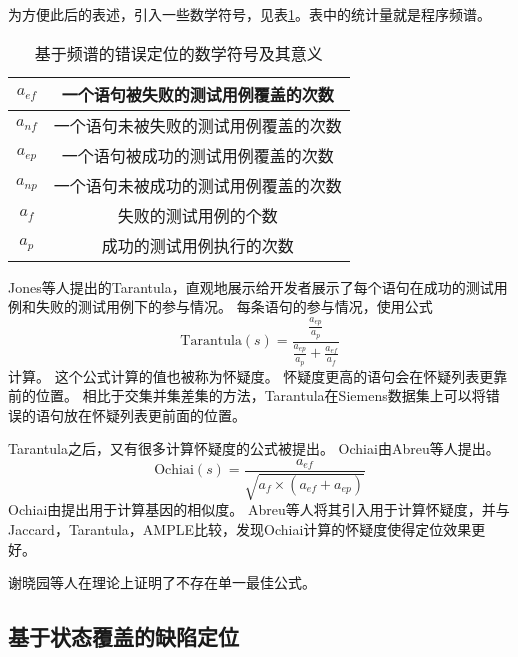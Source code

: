 为方便此后的表述，引入一些数学符号，见表\ref{spec_symbol}。表中的统计量就是程序频谱。
\begin{table}
\centering
\begin{tabular}{|c|c|}
\hline
$a_{ef}$ & 一个语句被失败的测试用例覆盖的次数 \\
\hline
$a_{nf}$ & 一个语句未被失败的测试用例覆盖的次数 \\
\hline
$a_{ep}$ & 一个语句被成功的测试用例覆盖的次数 \\
\hline
$a_{np}$ & 一个语句未被成功的测试用例覆盖的次数 \\
\hline
$a_{f}$ & 失败的测试用例的个数 \\
\hline
$a_{p}$ & 成功的测试用例执行的次数 \\
\hline
\end{tabular}
\caption{基于频谱的错误定位的数学符号及其意义}
\label{spec_symbol}
\end{table}

Jones等人提出的Tarantula\parencite{Jones2002Visualization}，直观地展示给开发者展示了每个语句在成功的测试用例和失败的测试用例下的参与情况。
每条语句的参与情况，使用公式
$$
\mathrm{Tarantula}(s) = \frac{\frac{a_{ep}}{a_{p}}}{\frac{a_{ep}}{a_{p}} + \frac{a_{ef}}{a_{f}}}
$$
计算。
这个公式计算的值也被称为怀疑度。
怀疑度更高的语句会在怀疑列表更靠前的位置。
相比于交集并集差集的方法，Tarantula在Siemens数据集上可以将错误的语句放在怀疑列表更前面的位置\parencite{Jones2005Empirical}。

Tarantula之后，又有很多计算怀疑度的公式被提出。
Ochiai由Abreu等人提出\parencite{Abreu2006An}。
$$
\mathrm{Ochiai}(s) = \frac{a_{ef}}{\sqrt{a_{f} \times (a_{ef} + a_{ep})}}
$$
Ochiai由\parencite{Meyer2004Comparison}提出用于计算基因的相似度。
Abreu等人将其引入用于计算怀疑度，并与Jaccard\parencite{Chen2002Pinpoint}，Tarantula，AMPLE\parencite{Dallmeier2005Lightweight}比较，发现Ochiai计算的怀疑度使得定位效果更好\parencite{Abreu2006An,Abreu2007On}。

谢晓园等人在理论上证明了不存在单一最佳公式\parencite{yoo2014no}。

\subsection{基于状态覆盖的缺陷定位}




